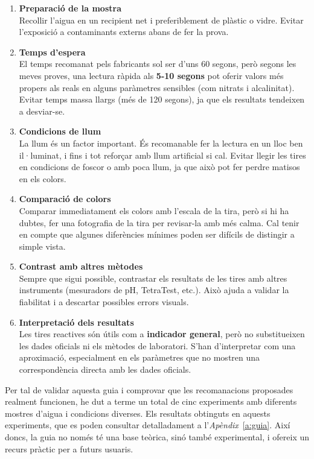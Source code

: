 \begin{enumerate}
    \item \textbf{Preparació de la mostra} \\
    Recollir l’aigua en un recipient net i preferiblement de plàstic o vidre. Evitar l’exposició a contaminants externs abans de fer la prova.

    \item \textbf{Temps d’espera} \\
    El temps recomanat pels fabricants sol ser d’uns 60 segons, però segons les meves proves, una lectura ràpida als \textbf{5-10 segons} pot oferir valors més propers als reals en alguns paràmetres sensibles (com nitrats i alcalinitat). Evitar temps massa llargs (més de 120 segons), ja que els resultats tendeixen a desviar-se.

    \item \textbf{Condicions de llum} \\
    La llum és un factor important. És recomanable fer la lectura en un lloc ben il·luminat, i fins i tot reforçar amb llum artificial si cal. Evitar llegir les tires en condicions de foscor o amb poca llum, ja que això pot fer perdre matisos en els colors.

    \item \textbf{Comparació de colors} \\
    Comparar immediatament els colors amb l’escala de la tira, però si hi ha dubtes, fer una fotografia de la tira per revisar-la amb més calma. Cal tenir en compte que algunes diferències mínimes poden ser difícils de distingir a simple vista.

    \item \textbf{Contrast amb altres mètodes} \\
    Sempre que sigui possible, contrastar els resultats de les tires amb altres instruments (mesuradors de pH, TetraTest, etc.). Això ajuda a validar la fiabilitat i a descartar possibles errors visuals.

    \item \textbf{Interpretació dels resultats} \\
    Les tires reactives són útils com a \textbf{indicador general}, però no substitueixen les dades oficials ni els mètodes de laboratori. S’han d’interpretar com una aproximació, especialment en els paràmetres que no mostren una correspondència directa amb les dades oficials.
\end{enumerate}

Per tal de validar aquesta guia i comprovar que les recomanacions proposades realment funcionen, he dut a terme un total de cinc experiments amb diferents mostres d’aigua i condicions diverses. Els resultats obtinguts en aquests experiments, que es poden consultar detalladament a l'\textit{Apèndix}~\ref{a:guia}. Així doncs, la guia no només té una base teòrica, sinó també experimental, i ofereix un recurs pràctic per a futurs usuaris.



